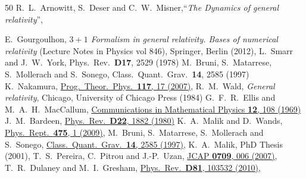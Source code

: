 \documentclass[notitlepage,onecolumn,floatfix,preprintnumbers,aps,prd,showpacs,nofootinbib,amsmath,amssymb,amsfonts]{revtex4-1}
\newcommand{\<}{\langle}
\renewcommand{\>}{\rangle}
\begin{document}
\begin{thebibliography}{50}
  R.~L.~Arnowitt, S.~Deser and C.~W.~Misner,``\textit{The Dynamics of general relativity}'',

%
	E.\ Gourgoulhon, \textit{$3+1$ Formalism in general relativity. Bases of numerical relativity} (Lecture Notes in Physics vol 846), Springer, Berlin (2012), 
%
	L.\ Smarr and J.\ W.\ York, 
	Phys.\ Rev.\ \textbf{D17}, 2529 (1978)
%
	M.\ Bruni, S.\ Matarrese, S.\ Mollerach and S.\ Sonego, 
	Class.\ Quant.\ Grav.\ \textbf{14}, 2585 (1997)
%
	K.\ Nakamura, 
	\href{\doibase 10.1143/PTP.117.17}{Prog.\ Theor.\ Phys.\ \textbf{117}, 17 (2007)}, 
%
	R.\ M.\ Wald, \textit{General relativity}, Chicago, University of Chicago Press (1984)
%
	G.\ F.\ R.\ Ellis and M.\ A.\ H.\ MacCallum, 
	\href{\doibase 10.1007/BF01645908}{Communications in Mathematical Physics \textbf{12}, 108 (1969)}
%
	J.\ M.\ Bardeen, 
	\href{\doibase 10.1103/PhysRevD.22.1882}{Phys.\ Rev.\ \textbf{D22}, 1882 (1980)}
%
	K.\ A.\ Malik and D.\ Wands, 
	\href{\doibase 10.1016/j.physrep.2009.03.001}{Phys.\ Rept.\ \textbf{475}, 1 (2009)}, 
%
	M.\ Bruni, S.\ Matarrese, S.\ Mollerach and S.\ Sonego, 
	\href{\doibase 10.1088/0264-9381/14/9/014}{Class.\ Quant.\ Grav.\ \textbf{14}, 2585 (1997)}, 
%
	K.\ A.\ Malik, 
	PhD Thesis (2001),
%
	T.\ S.\ Pereira, C.\ Pitrou and J.-P.\ Uzan, 
	\href{\doibase 10.1088/1475-7516/2007/09/006}{JCAP \textbf{0709}, 006 (2007)}, 
%
	T.\ R.\ Dulaney and M.\ I.\ Gresham, 
	\href{\doibase 10.1103/PhysRevD.81.103532}{Phys.\ Rev.\ \textbf{D81}, 103532 (2010)}, 

\end{thebibliography}
\end{document}

